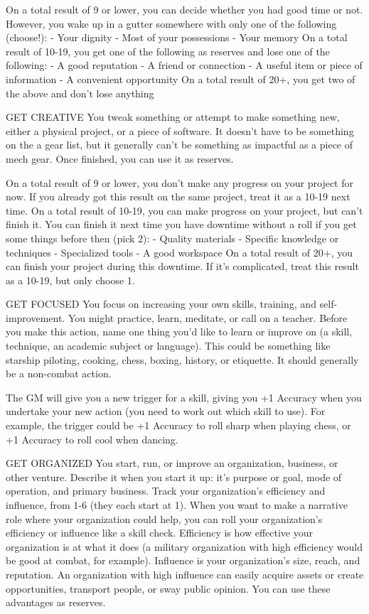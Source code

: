 On a total result of 9 or lower, you can decide whether you had good time or not. However, you
wake up in a gutter somewhere with only one of the following (choose!):
    -    Your dignity
    -    Most of your possessions
    -    Your memory
On a total result of 10-19, you get one of the following as reserves and lose one of the following:
    -    A good reputation
    -    A friend or connection
    -    A useful item or piece of information
    -    A convenient opportunity
On a total result of 20+, you get two of the above and don’t lose anything

GET CREATIVE
You tweak something or attempt to make something new, either a physical project, or a piece of
software. It doesn’t have to be something on the a gear list, but it generally can’t be something as
impactful as a piece of mech gear. Once finished, you can use it as reserves.




On a total result of 9 or lower, you don’t make any progress on your project for now. If you already
got this result on the same project, treat it as a 10-19 next time.
On a total result of 10-19, you can make progress on your project, but can’t finish it. You can finish
it next time you have downtime without a roll if you get some things before then (pick 2):
    -    Quality materials
    -    Specific knowledge or techniques
    -    Specialized tools
    -    A good workspace
On a total result of 20+, you can finish your project during this downtime. If it’s complicated, treat
this result as a 10-19, but only choose 1.

GET FOCUSED
You focus on increasing your own skills, training, and self-improvement. You might practice, learn,
meditate, or call on a teacher. Before you make this action, name one thing you’d like to learn or
improve on (a skill, technique, an academic subject or language). This could be something like
starship piloting, cooking, chess, boxing, history, or etiquette. It should generally be a non-combat
action.

The GM will give you a new trigger for a skill, giving you +1 Accuracy when you undertake your
new action (you need to work out which skill to use). For example, the trigger could be +1
Accuracy to roll sharp when playing chess, or +1 Accuracy to roll cool when dancing.

GET ORGANIZED
You start, run, or improve an organization, business, or other venture. Describe it when you start it
up: it’s purpose or goal, mode of operation, and primary business. Track your organization’s
efficiency and influence, from 1-6 (they each start at 1). When you want to make a narrative role
where your organization could help, you can roll your organization’s efficiency or influence like a
skill check. Efficiency is how effective your organization is at what it does (a military organization
with high efficiency would be good at combat, for example). Influence is your organization’s size,
reach, and reputation. An organization with high influence can easily acquire assets or create
opportunities, transport people, or sway public opinion. You can use these advantages as
reserves.

